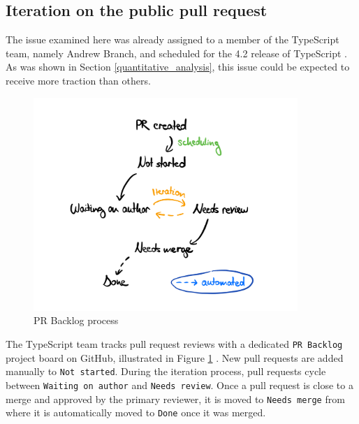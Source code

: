 \documentclass[12pt]{scrartcl}
\def\code#1{\texttt{\frenchspacing#1}}
\begin{document}
\subsection{Iteration on the public pull request}
\label{case_study:iteration}

The issue examined here was already assigned to a member of the TypeScript team, namely Andrew Branch, and scheduled for the 4.2 release of TypeScript \cite{41317}. As was shown in Section \ref{quantitative_analysis}, this issue could be expected to receive more traction than others.

\begin{figure}
    \centering
    \includegraphics[width=10cm]{images/pr_backlog.png}
    \caption{PR Backlog process}
    \label{fig:pr_backlog}
\end{figure}

The TypeScript team tracks pull request reviews with a dedicated \code{PR Backlog} project board on GitHub, illustrated in Figure \ref{fig:pr_backlog} \cite{PRBacklog}. New pull requests are added manually to \code{Not started}. During the iteration process, pull requests cycle between \code{Waiting on author} and \code{Needs review}. Once a pull request is close to a merge and approved by the primary reviewer, it is moved to \code{Needs merge} from where it is automatically moved to \code{Done} once it was merged.
\end{document}
